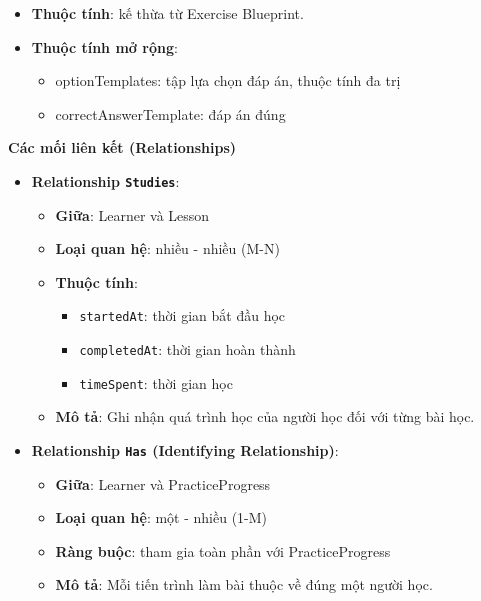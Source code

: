 \begin{itemize}
\begin{itemize}
    \item \textbf{Thuộc tính}: kế thừa từ Exercise Blueprint.
    
    \item \textbf{Thuộc tính mở rộng}:
    \begin{itemize}
        \item optionTemplates: tập lựa chọn đáp án, thuộc tính đa trị
        \item correctAnswerTemplate: đáp án đúng
    \end{itemize}
\end{itemize}

\end{itemize}

\textbf{Các mối liên kết (Relationships)}

\begin{itemize}

\item \textbf{Relationship \texttt{Studies}}:
\begin{itemize}
    \item \textbf{Giữa}: Learner và Lesson
    \item \textbf{Loại quan hệ}: nhiều - nhiều (M-N)
    \item \textbf{Thuộc tính}:
    \begin{itemize}
        \item \texttt{startedAt}: thời gian bắt đầu học
        \item \texttt{completedAt}: thời gian hoàn thành
        \item \texttt{timeSpent}: thời gian học
    \end{itemize}
    \item \textbf{Mô tả}: Ghi nhận quá trình học của người học đối với từng bài học.
\end{itemize}


\item \textbf{Relationship \texttt{Has} (Identifying Relationship)}:
\begin{itemize}
    \item \textbf{Giữa}: Learner và PracticeProgress
    \item \textbf{Loại quan hệ}: một - nhiều (1-M)
    \item \textbf{Ràng buộc}: tham gia toàn phần với PracticeProgress
    \item \textbf{Mô tả}: Mỗi tiến trình làm bài thuộc về đúng một người học.
\end{itemize}



\end{itemize}
